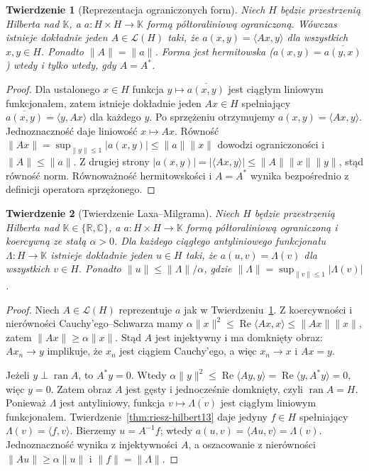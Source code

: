\documentclass[11pt,a4paper]{article}
\numberwithin{equation}{section}
\theoremstyle{plain}
\newtheorem{twierdzenie}{Twierdzenie}[section]
\theoremstyle{definition}
\theoremstyle{remark}
\newcommand{\R}{\mathbb R}
\newcommand{\C}{\mathbb C}
\newcommand{\K}{\mathbb K}
\begin{document}
\begin{twierdzenie}[Reprezentacja ograniczonych form]
\label{thm:form-repr13}
Niech $H$ będzie przestrzenią Hilberta nad $\K$,
a $a:H\times H\to\K$ formą półtoraliniową ograniczoną.
Wówczas istnieje dokładnie jeden $A\in\mathcal L(H)$ taki, że
$a(x,y)=\langle Ax,y\rangle$ dla wszystkich $x,y\in H$.
Ponadto $\|A\|=\|a\|$.
Forma jest hermitowska ($a(x,y)=\overline{a(y,x)}$) wtedy
i tylko wtedy, gdy $A=A^*$.
\end{twierdzenie}
\begin{proof}
Dla ustalonego $x\in H$ funkcja
$y\mapsto\overline{a(x,y)}$ jest ciągłym liniowym funkcjonałem,
zatem istnieje dokładnie jeden $Ax\in H$ spełniający
$\overline{a(x,y)}=\langle y,Ax\rangle$ dla każdego $y$.
Po sprzężeniu otrzymujemy $a(x,y)=\langle Ax,y\rangle$.
Jednoznaczność daje liniowość $x\mapsto Ax$.
Równość $\|Ax\|=\sup_{\|y\|\le1}|a(x,y)|\le\|a\|\|x\|$
dowodzi ograniczoności i $\|A\|\le\|a\|$.
Z drugiej strony
$|a(x,y)|=|\langle Ax,y\rangle|\le\|A\|\|x\|\|y\|$,
stąd równość norm. Równoważność hermitowskości i $A=A^*$
wynika bezpośrednio z definicji operatora sprzężonego.
\end{proof}

\begin{twierdzenie}[Twierdzenie Laxa--Milgrama]
\label{thm:lax-milgram13}
Niech $H$ będzie przestrzenią Hilberta nad $\K\in\{\R,\C\}$,
a $a:H\times H\to\K$ formą półtoraliniową ograniczoną
i koercywną ze stałą $\alpha>0$. Dla każdego ciągłego
\emph{antyliniowego} funkcjonału $\Lambda:H\to\K$ istnieje
dokładnie jeden $u\in H$ taki, że
$a(u,v)=\Lambda(v)$ dla wszystkich $v\in H$.
Ponadto $\|u\|\le\|\Lambda\|/\alpha$, gdzie
$\|\Lambda\|=\sup_{\|v\|\le1}|\Lambda(v)|$.
\end{twierdzenie}
\begin{proof}
Niech $A\in\mathcal L(H)$ reprezentuje $a$ jak w
Twierdzeniu~\ref{thm:form-repr13}. Z koercywności i nierówności
Cauchy'ego--Schwarza mamy
$\alpha\|x\|^2\le\operatorname{Re}\langle Ax,x\rangle
\le\|Ax\|\|x\|$, zatem $\|Ax\|\ge\alpha\|x\|$.
Stąd $A$ jest injektywny i ma domknięty obraz:
$Ax_n\to y$ implikuje, że $x_n$ jest ciągiem Cauchy'ego,
a więc $x_n\to x$ i $Ax=y$.

Jeżeli $y\perp\operatorname{ran}A$, to $A^*y=0$.
Wtedy
$\alpha\|y\|^2\le\operatorname{Re}\langle Ay,y\rangle
=\operatorname{Re}\langle y,A^*y\rangle=0$,
więc $y=0$. Zatem obraz $A$ jest gęsty i jednocześnie
domknięty, czyli $\operatorname{ran}A=H$.
Ponieważ $\Lambda$ jest antyliniowy, funkcja
$v\mapsto\overline{\Lambda(v)}$ jest ciągłym liniowym
funkcjonałem. Twierdzenie~\ref{thm:riesz-hilbert13} daje
jedyny $f\in H$ spełniający $\Lambda(v)=\langle f,v\rangle$.
Bierzemy $u=A^{-1}f$; wtedy $a(u,v)=\langle Au,v\rangle
=\Lambda(v)$. Jednoznaczność wynika z injektywności $A$,
a oszacowanie z nierówności $\|Au\|\ge\alpha\|u\|$
i $\|f\|=\|\Lambda\|$.
\end{proof}
\end{document}
